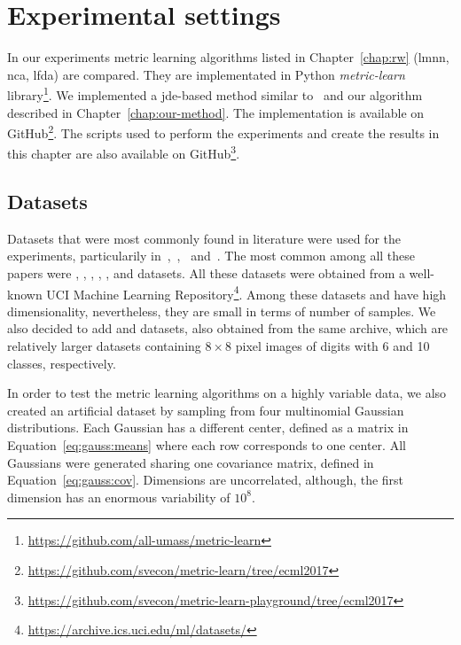 \documentclass[12pt,a4paper]{report}
\begin{document}
\section{Experimental settings} 
In our experiments metric learning algorithms listed in Chapter~\ref{chap:rw} (\ac{lmnn}, \ac{nca}, \ac{lfda}) are compared. They are implementated in Python \textit{metric-learn} library\footnote{\url{https://github.com/all-umass/metric-learn}}. We implemented a \ac{jde}-based method similar to~\citep{fukui2013evolutionary} and our algorithm described in Chapter~\ref{chap:our-method}. The implementation is available on GitHub\footnote{\url{https://github.com/svecon/metric-learn/tree/ecml2017}}. The scripts used to perform the experiments and create the results in this chapter are also available on GitHub\footnote{\url{https://github.com/svecon/metric-learn-playground/tree/ecml2017}}.

\subsection{Datasets} \label{chap:exp:datasets}
Datasets that were most commonly found in literature were used for the experiments, particularily in~\citep{xing2002distance},~\citep{weinberger2009distance},~\citep{jacobgoldberger2004neighbourhood} and~\citep{fukui2013evolutionary}. The most common among all these papers were , , , , ,  and  datasets. All these datasets were obtained from a well-known UCI Machine Learning Repository\footnote{\url{https://archive.ics.uci.edu/ml/datasets/}}. Among these datasets  and  have high dimensionality, nevertheless, they are small in terms of number of samples. We also decided to add  and  datasets, also obtained from the same archive, which are relatively larger datasets containing $8\times 8$ pixel images of digits with 6 and 10 classes, respectively.

In order to test the metric learning algorithms on a highly variable data, we also created an artificial dataset  by sampling from four multinomial Gaussian distributions. Each Gaussian has a different center, defined as a matrix in Equation~\ref{eq:gauss:means} where each row corresponds to one center. All Gaussians were generated sharing one covariance matrix, defined in Equation~\ref{eq:gauss:cov}. Dimensions are uncorrelated, although, the first dimension has an enormous variability of $10^8$.
\end{document}
